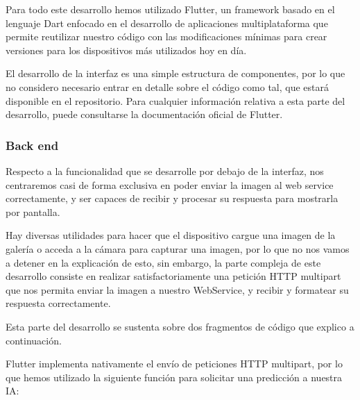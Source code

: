 \documentclass{article}
\begin{document}

Para todo este desarrollo hemos utilizado Flutter, un framework basado en el lenguaje Dart enfocado en el desarrollo de aplicaciones multiplataforma que permite reutilizar nuestro código con las modificaciones mínimas para crear versiones para los dispositivos más utilizados hoy en día.

El desarrollo de la interfaz es una simple estructura de componentes, por lo que no considero necesario entrar en detalle sobre el código como tal, que estará disponible en el repositorio. Para cualquier información relativa a esta parte del desarrollo, puede consultarse la documentación oficial de Flutter.

\subsubsection{Back end}
Respecto a la funcionalidad que se desarrolle por debajo de la interfaz, nos centraremos casi de forma exclusiva en poder enviar la imagen al web service correctamente, y ser capaces de recibir y procesar su respuesta para mostrarla por pantalla.

Hay diversas utilidades para hacer que el dispositivo cargue una imagen de la galería o acceda a la cámara para capturar una imagen, por lo que no nos vamos a detener en la explicación de esto, sin embargo, la parte compleja de este desarrollo consiste en realizar satisfactoriamente una petición HTTP multipart que nos permita enviar la imagen a nuestro WebService, y recibir y formatear su respuesta correctamente.

Esta parte del desarrollo se sustenta sobre dos fragmentos de código que explico a continuación.

Flutter implementa nativamente el envío de peticiones HTTP multipart, por lo que hemos utilizado la siguiente función para solicitar una predicción a nuestra IA:
\end{document}
